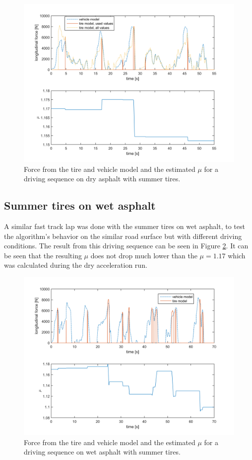 \begin{figure}[h]
	\centering
	\includegraphics[width=1.0\textwidth]{Pictures/force_mue_race_bb}
	\caption {Force from the tire and vehicle model and the estimated $ \mu $ for a driving sequence on dry asphalt with summer tires.}
	\label{force_mue_race_bb}
\end{figure}

\subsection{Summer tires on wet asphalt}
A similar fast track lap was done with the summer tires on wet asphalt, to test the algorithm's behavior on the similar road surface but with different driving conditions. The result from this driving sequence can be seen in Figure \ref{force_mue_blot_race_bb}. It can be seen that the resulting $ \mu $ does not drop much lower than the $ \mu = 1.17 $ which was calculated during the dry acceleration run. 

\begin{figure}[h]
	\centering
	\includegraphics[width=1.0\textwidth]{Pictures/force_mue_blot_race_bb}
	\caption {Force from the tire and vehicle model and the estimated $ \mu $ for a driving sequence on wet asphalt with summer tires.}
	\label{force_mue_blot_race_bb}
\end{figure}

